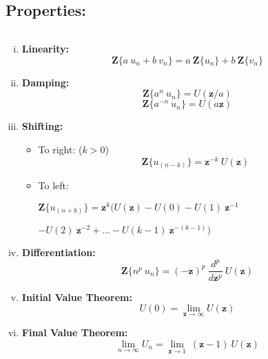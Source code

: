 \documentclass{article}
\begin{document}
{\subsection{\LARGE Properties:}
$\ $
\begin{enumerate}[(i)]
\item \textbf{Linearity:}
{\LARGE $$\textbf{Z}\{a\ u_n+b\ v_n\}=a\ \textbf{Z}\{u_n\}+b\ \textbf{Z}\{v_n\}$$}
\item \textbf{Damping:}
{\LARGE $$\textbf{Z}\{a^n\ u_n\}=U(\textbf{z}/a)$$
$$\textbf{Z}\{a^{-n}\ u_n\}=U(a\textbf{z})$$}
\newpage
\item \textbf{Shifting:}
\begin{itemize}
\item To right: ($k>0$)
{\LARGE $$\textbf{Z}\{u_{(n-k)}\}=\textbf{z}^{-k}\ U(\textbf{z})$$}
\item To left:
{\LARGE \begin{center}
$\textbf{Z}\{u_{(n+k)}\}=\textbf{z}^{k}\bigg( U(\textbf{z})-U(0)-U(1)\ \textbf{z}^{-1}$
\end{center}
\begin{flushright}
$-U(2)\ \textbf{z}^{-2}+ ... -U(k-1)\ \textbf{z}^{-(k-1)}\bigg)$
\end{flushright}}
\end{itemize}
\item \textbf{Differentiation:}
{\LARGE $$\textbf{Z}\{n^p\ u_n\}=(-\textbf{z})^p\  \frac{d^p}{d\textbf{z}^p}\ U(\textbf{z})$$}
\item \textbf{Initial Value Theorem:}
{\LARGE $$U(0)=\lim\limits_{\textbf{z}\rightarrow\infty}U(\textbf{z})$$}
\item \textbf{Final Value Theorem:}
{\LARGE $$\lim\limits_{n\rightarrow\infty}U_n=\lim\limits_{\textbf{z}\rightarrow 1}\ (\textbf{z}-1)\ U(\textbf{z})$$}
\end{enumerate}
\newpage
}
\end{document}
